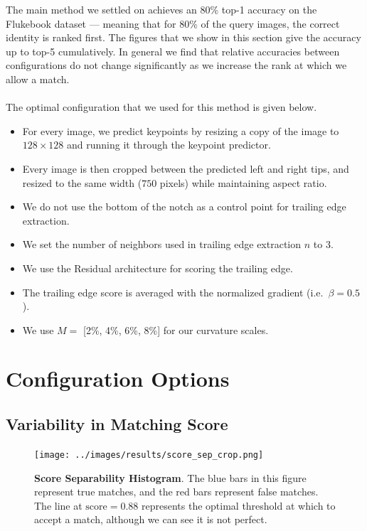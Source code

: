 The main method we settled on achieves an 80\% top-1 accuracy on the Flukebook dataset --- meaning that for 80\% of the query images, the correct identity is ranked first. 
The figures that we show in this section give the accuracy up to top-5 cumulatively.
In general we find that relative accuracies between configurations do not change significantly as we increase the rank at which we allow a match.
\\\\
The optimal configuration that we used for this method is given below.
\begin{itemize}
\item For every image, we predict keypoints by resizing a copy of the image to $128 \times 128$ and running it through the keypoint predictor.
\item Every image is then cropped between the predicted left and right tips, and resized to the same width ($750$ pixels) while maintaining aspect ratio. 
\item We do not use the bottom of the notch as a control point for trailing edge extraction.
\item We set the number of neighbors used in trailing edge extraction $n$ to $3$.
\item We use the Residual architecture for scoring the trailing edge.
\item The trailing edge score is averaged with the normalized gradient (i.e.\ $\beta = 0.5$).
\item We use $M =$ [2\%, 4\%, 6\%, 8\%] for our curvature scales.
\end{itemize}

\section{Configuration Options}

\subsection{Variability in Matching Score}

\begin{figure}[t]%
\centering
\texttt{[image: ../images/results/score\_sep\_crop.png]}
\caption{\textbf{Score Separability Histogram}. The blue bars in this figure represent true matches, and the red bars represent false matches. The line at $\text{score} = 0.88$ represents the optimal threshold at which to accept a match, although we can see it is not perfect.}
\label{fig:score_sep}
\end{figure}

